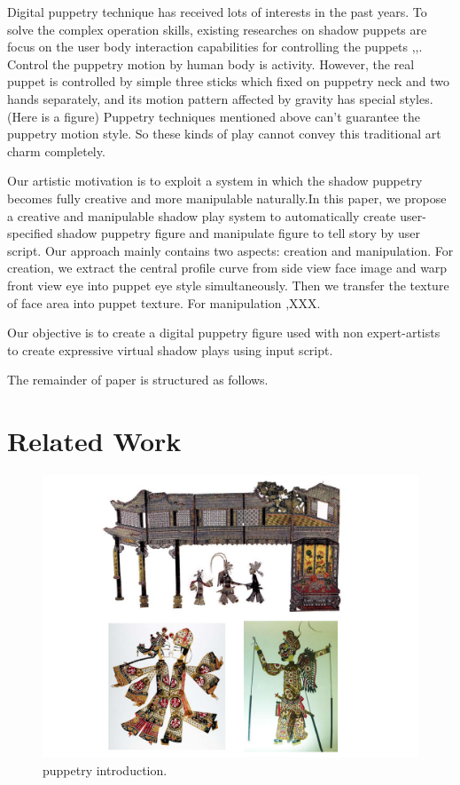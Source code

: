 \documentclass[letter]{sig-alternate}
\begin{document}
Digital puppetry technique has received lots of interests in the past years. To solve the complex operation skills, existing researches on shadow puppets are focus on the user body interaction capabilities for controlling the puppets  \cite{leite2012shape},\cite{lin2012action},\cite{zhang2012chinese}.
Control the puppetry motion by human body is activity. However, the real puppet is controlled by simple three sticks which fixed on puppetry neck and two hands separately, and its motion pattern affected by gravity has special styles. (Here is a figure) Puppetry techniques mentioned above can't guarantee the puppetry motion style. So these kinds of play cannot convey this traditional art charm completely.

Our artistic motivation is to exploit a system in which the shadow puppetry becomes fully creative and more manipulable naturally.In this paper, we propose a creative and manipulable shadow play system to automatically create user-specified shadow puppetry figure and manipulate figure to tell story by user script. Our approach mainly contains two aspects: creation and manipulation. For creation, we extract the central profile curve from side view face image and warp front view eye into puppet eye style simultaneously. Then we transfer the texture of face area into puppet texture. For manipulation ,XXX.

Our objective is to create a digital puppetry figure used with non expert-artists to create expressive virtual shadow plays using input script.

The remainder of paper is structured as follows.


\section{Related Work} \label{sec:related}


\begin{figure}[t]
\begin{center}
\includegraphics[scale=0.4]{figure/puppetru_introduction.pdf}
\caption{\small{puppetry introduction.}}
\label{fig:firstfig}
\end{center}
\end{figure}
\end{document}
